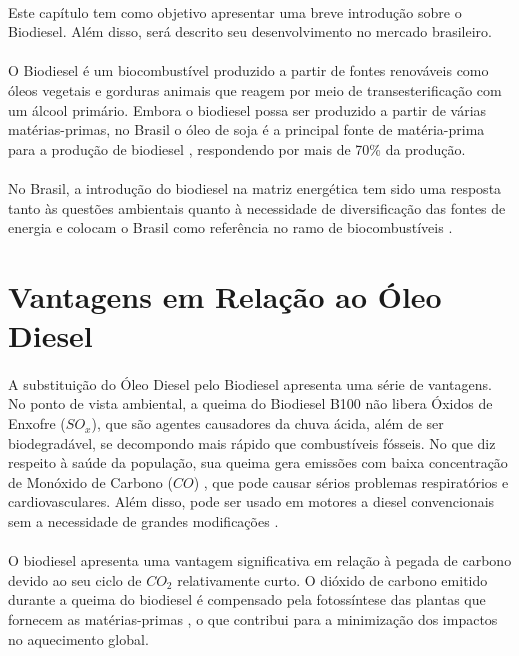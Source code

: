 \paragraph{} Este capítulo tem como objetivo apresentar uma breve introdução sobre o Biodiesel. Além disso, será descrito seu desenvolvimento no mercado brasileiro.

\paragraph{} O Biodiesel é um biocombustível produzido a partir de fontes renováveis como óleos vegetais e gorduras animais que reagem por meio de transesterificação com um álcool primário. Embora o biodiesel possa ser produzido a partir de várias matérias-primas, no Brasil o óleo de soja é a principal fonte de matéria-prima para a produção de biodiesel \cite{biodiesel_def_anp}, respondendo por mais de 70\% da produção.
\paragraph{} No Brasil, a introdução do biodiesel na matriz energética tem sido uma resposta tanto às questões ambientais quanto à necessidade de diversificação das fontes de energia e colocam o Brasil como referência no ramo de biocombustíveis \cite{biodiesel_esp_anp}.

\section{Vantagens em Relação ao Óleo Diesel}
\paragraph{} A substituição do Óleo Diesel pelo Biodiesel apresenta uma série de vantagens. No ponto de vista ambiental, a queima do Biodiesel B100 não libera Óxidos de Enxofre (\(SO_x\)), que são agentes causadores da chuva ácida, além de ser biodegradável, se decompondo mais rápido que combustíveis fósseis. No que diz respeito à saúde da população, sua queima gera emissões com baixa concentração de Monóxido de Carbono (\(CO\)) \cite{silva2023biodiesel}, que pode causar sérios problemas respiratórios e cardiovasculares. Além disso, pode ser usado em motores a diesel convencionais sem a necessidade de grandes modificações \cite{totalenergies_biodiesel}.
\paragraph{} O biodiesel apresenta uma vantagem significativa em relação à pegada de carbono devido ao seu ciclo de \(CO_2\) relativamente curto. O dióxido de carbono emitido durante a queima do biodiesel é compensado pela fotossíntese das plantas que fornecem as matérias-primas \cite{silva2023biodiesel}, o que contribui para a minimização dos impactos no aquecimento global.
